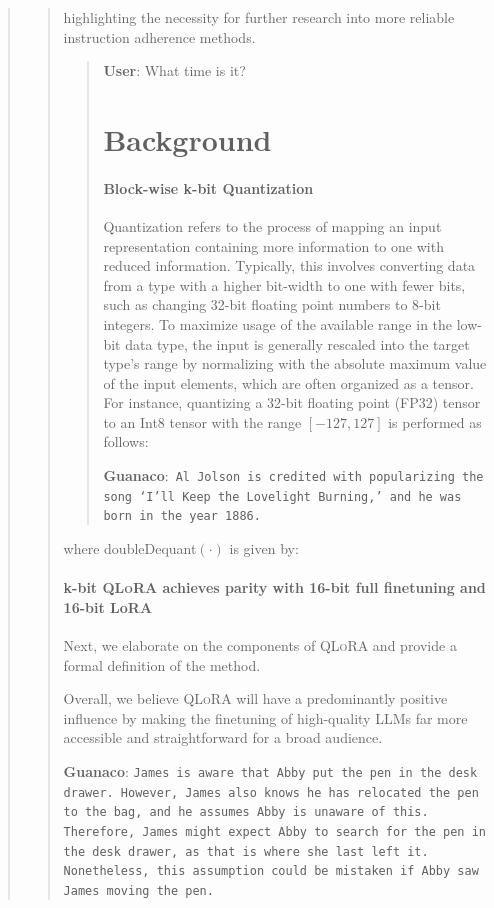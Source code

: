 \begin{quote}
\begin{quote}
highlighting the necessity for further research into more reliable instruction adherence methods.

\begin{quote}
    \textbf{User}: What time is it?

\section{Background}
\paragraph{Block-wise k-bit Quantization} Quantization refers to the process of mapping an input representation containing more information to one with reduced information. Typically, this involves converting data from a type with a higher bit-width to one with fewer bits, such as changing 32-bit floating point numbers to 8-bit integers. To maximize usage of the available range in the low-bit data type, the input is generally rescaled into the target type’s range by normalizing with the absolute maximum value of the input elements, which are often organized as a tensor. For instance, quantizing a 32-bit floating point (FP32) tensor to an Int8 tensor with the range $[-127, 127]$ is performed as follows:

     \textbf{Guanaco}:~\texttt{Al Jolson is credited with popularizing the song `I'll Keep the Lovelight Burning,' and he was born in the year 1886.}
 \end{quote}

where doubleDequant$(\cdot)$ is given by:

\paragraph{k-bit \textsc{QLoRA} achieves parity with 16-bit full finetuning and 16-bit LoRA}

Next, we elaborate on the components of \textsc{QLoRA} and provide a formal definition of the method.

Overall, we believe \textsc{QLoRA} will have a predominantly positive influence by making the finetuning of high-quality LLMs far more accessible and straightforward for a broad audience.

    \textbf{Guanaco}: \texttt{James is aware that Abby put the pen in the desk drawer. However, James also knows he has relocated the pen to the bag, and he assumes Abby is unaware of this. Therefore, James might expect Abby to search for the pen in the desk drawer, as that is where she last left it. Nonetheless, this assumption could be mistaken if Abby saw James moving the pen.}
\end{quote}


\end{quote}
